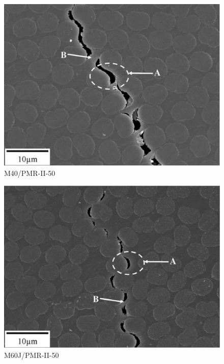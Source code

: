 % 
%               
%          
% 

\begin{subfigure}{0.49\linewidth}
  \setlength{\figwidth}{\linewidth}
  \centering
  \includegraphics[width=\figwidth,height=\figheight,keepaspectratio]{Exp_RVE_GentzM2004_M40-PMR-II-50}
  \caption{M40/PMR-II-50}%
  \label{fig:Exp:RVE:GentzM2004:M40}
\end{subfigure}%
\hfill
\begin{subfigure}{0.49\linewidth}
  \setlength{\figwidth}{\linewidth}
  \centering
  \includegraphics[width=\figwidth,height=\figheight,keepaspectratio]{Exp_RVE_GentzM2004_M60J-PMR-II-50}
  \caption{M60J/PMR-II-50}%
  \label{fig:Exp:RVE:GentzM2004:M60}
\end{subfigure}%